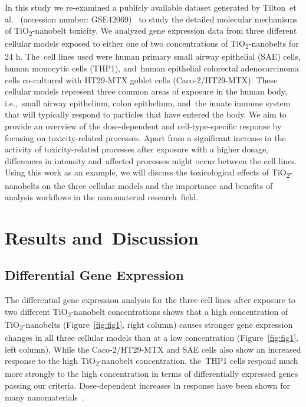 \documentclass[ijms,article,accept,moreauthors,pdftex]{Definitions/mdpi}
\begin{document}
In this study we re-examined a publicly available dataset generated by Tilton~{et al.}~\cite{Tilton2013} (accession number: GSE42069)~\cite{Edgar2002} to study the detailed molecular mechanisms of TiO\textsubscript{2}-nanobelt toxicity. We analyzed gene expression data from three different {cellular models} exposed to either one of two concentrations of TiO\textsubscript{2}-nanobelts for 24 h. The~cell lines used were human primary small airway epithelial (SAE) cells, human monocytic cells (THP1), and~human epithelial colorectal adenocarcinoma cells {co-cultured with HT29-MTX goblet cells (Caco-2/HT29-MTX)}. These {cellular models} represent three common areas of exposure in the human body, i.e.,~{small airway} epithelium, colon epithelium, and~the innate immune system that will typically respond to particles that have entered the body. We aim to provide an overview of the dose-dependent and cell-type-specific response by focusing on toxicity-related processes. Apart from a significant increase in the activity of toxicity-related processes after exposure with a higher dosage, differences in intensity and~affected processes might occur between the cell lines. Using this work as an example, we will discuss the toxicological effects of TiO\textsubscript{2}-nanobelts on the three {cellular models} and the importance and benefits of analysis workflows in the nanomaterial research~field.
 
\section{Results and~Discussion}
\unskip

\subsection{Differential Gene Expression}
The differential gene expression analysis for the three cell lines after exposure to two different TiO\textsubscript{2}-nanobelt concentrations shows that a high concentration of TiO\textsubscript{2}-nanobelts (Figure~\ref{fig:fig1}, right column) causes stronger gene expression changes in all three {cellular models} than at a low concentration (Figure~\ref{fig:fig1}, left column). While the {Caco-2/HT29-MTX} and SAE cells also show an increased response to the high TiO\textsubscript{2}-nanobelt concentration, the~THP1 cells respond much more strongly to the high concentration in terms of differentially expressed genes passing our criteria. Dose-dependent increases in response have been shown for many nanomaterials~\cite{Iavicoli2018,Ding2005}.
\end{document}
